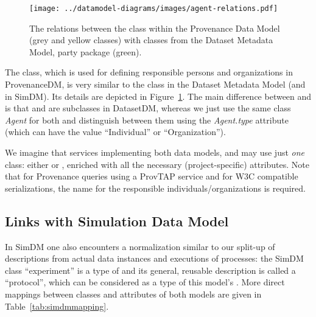 \begin{figure}[h]
\centering
\texttt{[image: ../datamodel-diagrams/images/agent-relations.pdf]}
\caption{The relations between the  class within the Provenance Data Model 
(grey and yellow classes) with classes from the Dataset Metadata Model, party package (green).}
\label{fig:agent-relations}
\end{figure}

The  class, which is used for defining responsible persons and 
organizations in ProvenanceDM, is very similar to the  class in the Dataset Metadata Model (and in SimDM). Its details are depicted in Figure~\ref{fig:agent-relations}.
The main difference between  and  is that  and  are subclasses in DatasetDM, whereas we just use the same class \emph{Agent} for both and distinguish between them using the \emph{Agent.type} attribute (which can have the value ``Individual'' or ``Organization'').


We imagine that services implementing both data models,  and  may use just \emph{one} class: either  or , enriched with all the necessary (project-specific) attributes. Note that for Provenance queries using a ProvTAP service and for W3C compatible serializations, the name  for the responsible individuals/organizations is required.



\subsection{Links with Simulation Data Model}
In SimDM one also encounters a normalization similar to our split-up of descriptions from 
actual data instances and executions of processes: the SimDM class ``experiment'' 
is a type of  and its general, reusable description is called a ``protocol'',
which can be considered as a type of this model's . 
More direct mappings between classes and attributes of both models are given in Table~\ref{tab:simdmmapping}.


